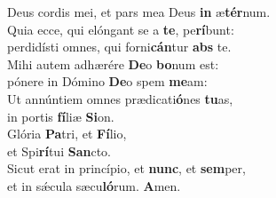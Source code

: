 \oddverse Deus cordis mei, et pars mea Deus \textbf{in} æ\textbf{tér}num.\\
\evenverse Quia ecce, qui elóngant se a \textbf{te}, pe\textbf{rí}bunt:~\*\\
\evenverse perdidísti omnes, qui forni\textbf{cán}tur \textbf{abs} te.\\
\oddverse Mihi autem adhærére \textbf{De}o \textbf{bo}num est:~\*\\
\oddverse pónere in Dómino \textbf{De}o spem \textbf{me}am:\\
\evenverse Ut annúntiem omnes prædicati\textbf{ó}nes \textbf{tu}as,~\*\\
\evenverse in portis \textbf{fí}liæ \textbf{Si}on.\\
\oddverse Glória \textbf{Pa}tri, et \textbf{Fí}lio,~\*\\
\oddverse et Spi\textbf{rí}tui \textbf{San}cto.\\
\evenverse Sicut erat in princípio, et \textbf{nunc}, et \textbf{sem}per,~\*\\
\evenverse et in sǽcula sæcu\textbf{ló}rum. \textbf{A}men.\\
